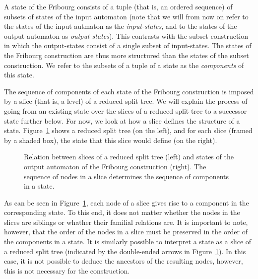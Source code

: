 A state of the Fribourg consists of a tuple (that is, an ordered sequence) of subsets of states of the input automaton (note that we will from now on refer to the states of the input autmaton as the \textit{input-states}, and to the states of the output automaton as \textit{output-states}). This contrasts with the subset construction in which the output-states consist of a single subset of input-states. The states of the Fribourg construction are thus more structured than the states of the subset construction. We refer to the subsets of a tuple of a state as the \textit{components} of this state.

The sequence of components of each state of the Fribourg construction is imposed by a slice (that is, a level) of a reduced split tree. We will explain the process of going from an existing state over the slices of a reduced split tree to a successor state further below. For now, we look at how a slice defines the structure of a state. Figure~\ref{slices} shows a reduced split tree (on the left), and for each slice (framed by a shaded box), the state that this slice would define (on the right).

\begin{figure}[htb]
\centering
\Slices
\caption{Relation between slices of a reduced split tree (left) and states of the output automaton of the Fribourg construction (right). The sequence of nodes in a slice determines the sequence of components in a state.}
\label{slices}
\end{figure}

As can be seen in Figure~\ref{slices}, each node of a slice gives rise to a component in the corresponding state. To this end, it does not matter whether the nodes in the slices are siblings or whather their familial relations are. It is important to note, however, that the order of the nodes in a slice must be preserved in the order of the components in a state. It is similarly possible to interpret a state as a slice of a reduced split tree (indicated by the double-ended arrows in Figure~\ref{slices}). In this case, it is not possible to deduce the ancestors of the resulting nodes, however, this is not necessary for the construction.

